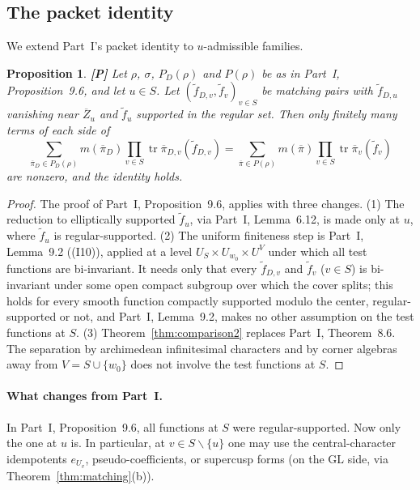 \documentclass[12pt]{article}
\newcommand{\ov}[1]{\overline{#1}}
\newcommand{\tr}{\operatorname{tr}}
\newcommand{\GL}{\mathrm{GL}}
\newcommand{\Zb}{\ov{Z}}
\newcommand{\pib}{\ov{\pi}}
\newcommand{\Pv}{\textbf{[P]}}
\theoremstyle{plain}
\newtheorem{proposition}[theorem]{Proposition}
\theoremstyle{definition}
\begin{document}
\subsection{The packet identity}\label{subsec:packet2}
We extend Part~I's packet identity to $u$-admissible families.

\begin{proposition}\label{prop:packet2}\Pv
Let $\rho$, $\sigma$, $P_D(\rho)$ and $P(\rho)$ be as in Part~I, Proposition~9.6, and let $u\in S$. Let $(\tilde f_{D,v},\tilde f_v)_{v\in S}$ be matching pairs with $\tilde f_{D,u}$ vanishing near $\Zb_u$ and $\tilde f_u$ supported in the regular set. Then only finitely many terms of each side of
\begin{equation}\label{eq:packet2}
\sum_{\pib_D\in P_D(\rho)}m(\pib_D)\prod_{v\in S}\tr\pib_{D,v}(\tilde f_{D,v})=\sum_{\pib\in P(\rho)}m(\pib)\prod_{v\in S}\tr\pib_v(\tilde f_v)
\end{equation}
are nonzero, and the identity holds.
\end{proposition}
\begin{proof}
The proof of Part~I, Proposition~9.6, applies with three changes. (1) The reduction to elliptically supported $\tilde f_u$, via Part~I, Lemma~6.12, is made only at $u$, where $\tilde f_u$ is regular-supported. (2) The uniform finiteness step is Part~I, Lemma~9.2 ((I10)), applied at a level $U_S\times U_{w_0}\times U^V$ under which all test functions are bi-invariant. It needs only that every $\tilde f_{D,v}$ and $\tilde f_v$ ($v\in S$) is bi-invariant under some open compact subgroup over which the cover splits; this holds for every smooth function compactly supported modulo the center, regular-supported or not, and Part~I, Lemma~9.2, makes no other assumption on the test functions at $S$. (3) Theorem~\ref{thm:comparison2} replaces Part~I, Theorem~8.6. The separation by archimedean infinitesimal characters and by corner algebras away from $V=S\cup\{w_0\}$ does not involve the test functions at $S$.
\end{proof}

\paragraph{What changes from Part~I.} In Part~I, Proposition~9.6, all functions at $S$ were regular-supported. Now only the one at $u$ is. In particular, at $v\in S\smallsetminus\{u\}$ one may use the central-character idempotents $e_{U_v}$, pseudo-coefficients, or supercusp forms (on the $\GL$ side, via Theorem~\ref{thm:matching}(b)).
\end{document}
